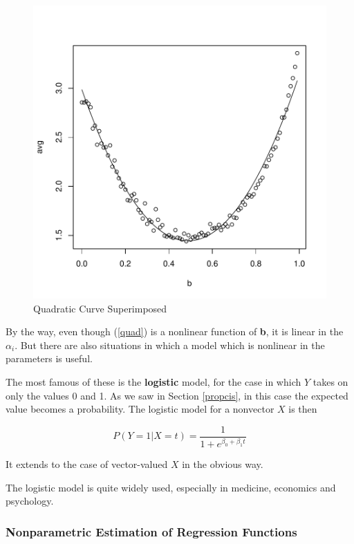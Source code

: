 \begin{figure}[tb] 
\centerline{
\includegraphics[width=5.0in]{Aloha2.pdf}
}
\caption{Quadratic Curve Superimposed}
\label{qc}
\end{figure}

By the way, even though (\ref{quad}) is a nonlinear function of {\bf b},
it is linear in the $\alpha_i$.  But there are also situations in which
a model which is nonlinear in the parameters is useful.

The most famous of these is the {\bf logistic} model, for the case in
which $Y$ takes on only the values 0 and 1.  As we saw in Section
\ref{propcis}, in this case the expected value becomes a probability.
The logistic model for a nonvector $X$ is then

\begin{equation}
P(Y = 1 | X = t) = \frac{1}{1+e^{\beta_0+\beta_1 t}}
\end{equation}

It extends to the case of vector-valued $X$ in the obvious way. 

The logistic model is quite widely used, especially in medicine,
economics and psychology.

\subsubsection{Nonparametric Estimation of Regression Functions}

